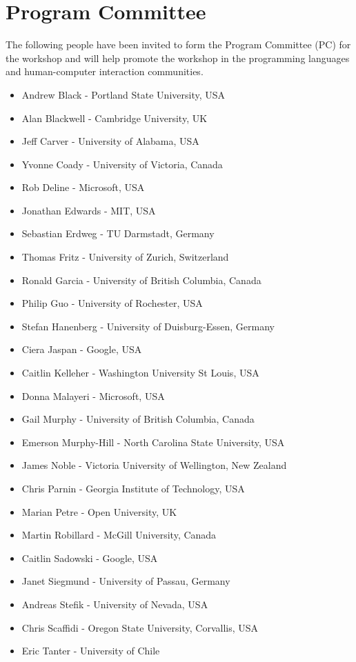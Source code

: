 \documentclass{sigplanconf}
\begin{document}
\section{Program Committee}

The following people have been invited to form the Program Committee (PC) for the workshop and will help promote the workshop in the programming languages and human-computer interaction communities.

\begin{itemize}
\item Andrew Black - Portland State University, USA
\item Alan Blackwell - Cambridge University, UK
\item Jeff Carver - University of Alabama, USA
\item Yvonne Coady - University of Victoria, Canada
\item Rob Deline - Microsoft, USA
\item Jonathan Edwards - MIT, USA
\item Sebastian Erdweg - TU Darmstadt, Germany
\item Thomas Fritz - University of Zurich, Switzerland
\item Ronald Garcia - University of British Columbia, Canada
\item Philip Guo - University of Rochester, USA
\item Stefan Hanenberg - University of Duisburg-Essen, Germany
\item Ciera Jaspan - Google, USA
\item Caitlin Kelleher - Washington University St Louis, USA
\item Donna Malayeri - Microsoft, USA
\item Gail Murphy - University of British Columbia, Canada
\item Emerson Murphy-Hill - North Carolina State University, USA
\item James Noble - Victoria University of Wellington, New Zealand
\item Chris Parnin - Georgia Institute of Technology, USA
\item Marian Petre - Open University, UK
\item Martin Robillard  - McGill University, Canada
\item Caitlin Sadowski - Google, USA
\item Janet Siegmund - University of Passau, Germany
\item Andreas Stefik - University of Nevada, USA
\item Chris Scaffidi - Oregon State University, Corvallis, USA
\item Eric Tanter - University of Chile
\end{itemize}
\end{document}
